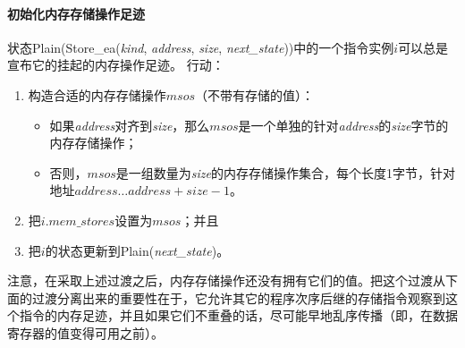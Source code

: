 \paragraph{初始化内存存储操作足迹}\label{omm:initiate_store_footprint}
状态{\sc Plain}({\sc Store\_ea}({\it kind}, {\it address}, {\it size}, {\it next\_state}))中的一个指令实例$i$可以总是宣布它的挂起的内存操作足迹。
行动：
\begin{enumerate}
\item 构造合适的内存存储操作$msos$（不带有存储的值）： %
  \begin{itemize}
  \item 如果{\it address}对齐到{\it size}，那么$msos$是一个单独的针对{\it address}的{\it size}字节的内存存储操作； %
  \item 否则，$msos$是一组数量为{\it size}的内存存储操作集合，每个长度1字节，针对地址$\textit{address}\ldots\textit{address}+\textit{size}-1$。  %
  \end{itemize}
\item 把$i.\textit{mem\_stores}$设置为$msos$；并且  %
\item 把$i$的状态更新到{\sc Plain}({\it next\_state})。  %
\end{enumerate}

\begin{commentary}
  注意，在采取上述过渡之后，内存存储操作还没有拥有它们的值。把这个过渡从下面的过渡分离出来的重要性在于，它允许其它的程序次序后继的存储指令观察到这个指令的内存足迹，并且如果它们不重叠的话，尽可能早地乱序传播（即，在数据寄存器的值变得可用之前）。
\end{commentary}


